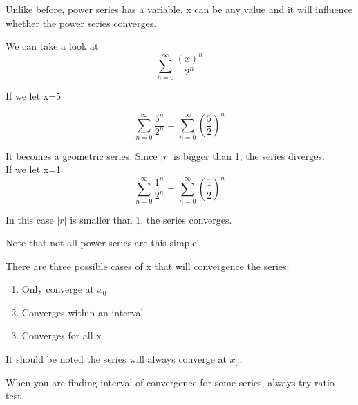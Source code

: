 	Unlike before, power series has a variable. x can be any value and it will influence whether the power series converges.
	
	\begin{simple}{}{}
	We can take a look at 
	$$\sum^\infty_{n=0}\frac{(x)^n}{2^n}$$
	
    If we let x=5
    
    $$\sum^\infty_{n=0}\frac{5^n}{2^n}=\sum^\infty_{n=0}\left(\frac{5}{2}\right)^n$$
    
    It becomes a geometric series. Since $|r|$ is bigger than 1, the series diverges.\\
    
    If we let x=1
    $$\sum^\infty_{n=0}\frac{1^n}{2^n}=\sum^\infty_{n=0}\left(\frac{1}{2}\right)^n$$
    
    In this case $|r|$ is smaller than 1, the series converges.
    
    Note that not all power series are this simple!
	\end{simple}
	
	\begin{theorem}{}{}
	There are three possible cases of x that will convergence the series:
	\begin{enumerate}
	    \item Only converge at $x_0$
	    \item Converges within an interval
	    \item Converges for all x
	\end{enumerate}
	It should be noted the series will always converge at $x_0$.
	\end{theorem}
	
	When you are finding interval of convergence for some series, always try ratio test.
	
